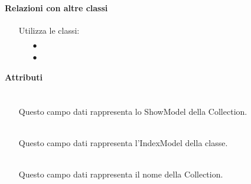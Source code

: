 \paragraph*{Relazioni con altre classi}
\begin{itemize}


\item[] Utilizza le classi:
\begin{itemize}
\item[$\bullet$] 
\item[$\bullet$] 
\end{itemize}
\end{itemize}

\paragraph*{Attributi}
\begin{itemize}
\item[]  \\ Questo campo dati rappresenta lo ShowModel della Collection.
\item[]  \\ Questo campo dati rappresenta l'IndexModel della classe.
\item[]  \\ Questo campo dati rappresenta il nome della Collection.
\end{itemize}

